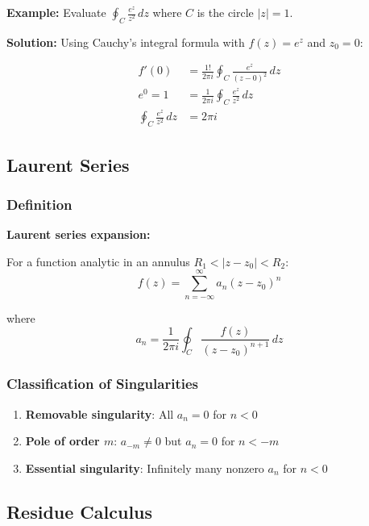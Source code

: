 \documentclass[12pt,a4paper]{article}
\begin{document}
\begin{examplebox}
\textbf{Example:} Evaluate $\oint_C \frac{e^z}{z^2} \, dz$ where $C$ is the circle $|z| = 1$.

\textbf{Solution:} Using Cauchy's integral formula with $f(z) = e^z$ and $z_0 = 0$:

\begin{align}
f'(0) &= \frac{1!}{2\pi i} \oint_C \frac{e^z}{(z - 0)^2} \, dz \\
e^0 = 1 &= \frac{1}{2\pi i} \oint_C \frac{e^z}{z^2} \, dz \\
\oint_C \frac{e^z}{z^2} \, dz &= 2\pi i
\end{align}
\end{examplebox}

\subsection{Laurent Series}
\subsubsection{Definition}
\begin{formulabox}
\textbf{Laurent series expansion:}

For a function analytic in an annulus $R_1 < |z - z_0| < R_2$:
\begin{equation}
f(z) = \sum_{n=-\infty}^{\infty} a_n (z - z_0)^n
\end{equation}

where
\begin{equation}
a_n = \frac{1}{2\pi i} \oint_C \frac{f(z)}{(z - z_0)^{n+1}} \, dz
\end{equation}
\end{formulabox}

\subsubsection{Classification of Singularities}
\begin{enumerate}
    \item \textbf{Removable singularity}: All $a_n = 0$ for $n < 0$
    \item \textbf{Pole of order $m$}: $a_{-m} \neq 0$ but $a_n = 0$ for $n < -m$
    \item \textbf{Essential singularity}: Infinitely many nonzero $a_n$ for $n < 0$
\end{enumerate}

\subsection{Residue Calculus}
\end{document}
